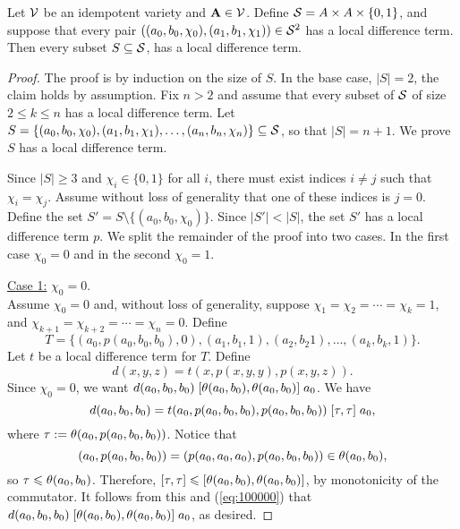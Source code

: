 \begin{lem}
  Let $\mathcal{V}$ be an idempotent variety and
  $\mathbf{A} \in \mathcal{V}$. Define
  $\mathcal{S}= A \times A \times \{0,1\}$, %
  and suppose that every pair
  $((a_0, b_0, \chi_0), (a_1, b_1, \chi_1)) \in \mathcal{S}^2$
  has a local difference term.
  Then every subset $S \subseteq \mathcal{S}$,
  has a local difference term.
\end{lem}
\begin{proof}
The proof is by induction on the size of $S$.  In the base case, $|S| = 2$,
the claim holds by assumption.
Fix $n>2$ and assume that every subset of $\mathcal{S}$ of size $2\leq k \leq n$ has a local
difference term. Let
$S = \{(a_0, b_0, \chi_0), (a_1, b_1, \chi_1), \dots, (a_{n}, b_{n},\chi_{n})\} \subseteq \mathcal{S}$,
so that $|S| = n+1$.  We prove $S$ has a local difference term.

Since $|S| \geq 3$ and $\chi_i \in \{0,1\}$ for all $i$, there must exist
indices $i\neq j$ such that $\chi_i = \chi_j$. Assume without loss of generality
that one of these indices is $j=0$.  Define
the set
$S' = S \setminus \{(a_0, b_0, \chi_0)\}$.
Since $|S'| < |S|$, the set $S'$ has a local difference term $p$.
We split the remainder of the proof into two cases. In the first case
$\chi_0 = 0$ and in the second
$\chi_0 = 1$.

\vskip3mm

\noindent \underline{Case 1:} $\chi_0 = 0$.
\\[4pt]
Assume $\chi_0 = 0$ and, 
without loss of generality, suppose $\chi_1 = \chi_2 =\cdots =\chi_k = 1$,
and $\chi_{k+1} = \chi_{k+2} = \cdots = \chi_{n} = 0$. Define
\[
T = \{(a_0, p(a_0, b_0, b_0), 0),
(a_1, b_1, 1), (a_2, b_2 1), \dots, (a_k, b_k, 1)\}.
\]
Let $t$ be a local difference term for $T$.
Define
\[
d(x,y,z) = t(x, p(x,y,y), p(x,y,z)).
\]
Since $\chi_0 =0$, we want $d(a_0,b_0,b_0)\mathrel{[\operatorname{\theta}(a_0,b_0), \operatorname{\theta}(a_0,b_0)]} a_0$.
We have
\begin{equation}
    \label{eq:100000}
  d(a_0,b_0,b_0) =
  t(a_0, p(a_0,b_0,b_0), p(a_0,b_0,b_0))\comm{\tau}{\tau} a_0,
\end{equation}
where $\tau:=\operatorname{\theta}(a_0, p(a_0,b_0,b_0))$.
Notice that
\[
(a_0, p(a_0,b_0,b_0)) = (p(a_0,a_0,a_0), p(a_0,b_0,b_0)) \in \operatorname{\theta}(a_0, b_0),
\]
so $\tau\leqslant \operatorname{\theta}(a_0,b_0)$. Therefore, 
$\mathrel{[\tau, \tau]} {\leqslant} \mathrel{[\operatorname{\theta}(a_0,b_0), \operatorname{\theta}(a_0,b_0)]}$,
by monotonicity of the commutator.
It follows from this and (\ref{eq:100000}) that
$d(a_0,b_0,b_0)\mathrel{[\operatorname{\theta}(a_0,b_0), \operatorname{\theta}(a_0,b_0)]} a_0$,
as desired.


\end{proof}
